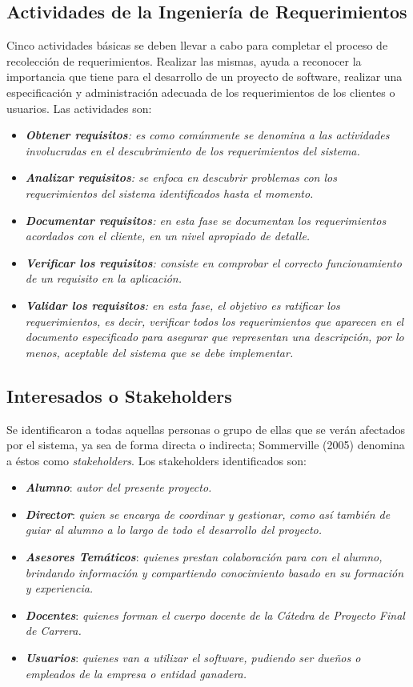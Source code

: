 \documentclass[11pt,oneside]{book}
\begin{document}
\subsection{Actividades de la Ingeniería de Requerimientos}
Cinco actividades básicas se deben llevar a cabo para completar el proceso de recolección de requerimientos. Realizar las mismas, ayuda a reconocer la importancia que tiene para el desarrollo de un proyecto de software, realizar una especificación y administración adecuada de los requerimientos de los clientes o usuarios. Las actividades son:
\begin{itemize}
\item \textit{\textbf{Obtener requisitos}: es como comúnmente se denomina a las actividades involucradas en el descubrimiento de los requerimientos del sistema.}
\item \textit{\textbf{Analizar requisitos}: se enfoca en descubrir problemas con los requerimientos del sistema identificados hasta el momento.}
\item \textit{\textbf{Documentar requisitos}: en esta fase se documentan los requerimientos acordados con el cliente, en un nivel apropiado de detalle.}
\item \textit{\textbf{Verificar los requisitos}: consiste en comprobar el correcto funcionamiento de un requisito en la aplicación.}
\item \textit{\textbf{Validar los requisitos}: en esta fase, el objetivo es ratificar los requerimientos, es decir, verificar todos los requerimientos que aparecen en el documento especificado para asegurar que representan una descripción, por lo menos, aceptable del sistema que se debe implementar.}
\end{itemize}

\subsection{Interesados o Stakeholders}
Se identificaron a todas aquellas personas o grupo de ellas que se verán afectados por el sistema, ya sea de forma directa o indirecta; Sommerville (2005) denomina a éstos como \textit{stakeholders}. Los stakeholders identificados son: 
\begin{itemize}
\item \textit{\textbf{Alumno}}: \textit{autor del presente proyecto.}
\item \textit{\textbf{Director}}: \textit{quien se encarga de coordinar y gestionar, como así también de guiar al alumno a lo largo de todo el desarrollo del proyecto.}
\item \textit{\textbf{Asesores Temáticos}}: \textit{quienes prestan colaboración para con el alumno, brindando información y compartiendo conocimiento basado en su formación y experiencia.}
\item \textit{\textbf{Docentes}}: \textit{quienes forman el cuerpo docente de la Cátedra de Proyecto Final de Carrera.}
\item \textit{\textbf{Usuarios}}: \textit{quienes van a utilizar el software, pudiendo ser dueños o empleados de la empresa o entidad ganadera.}
\end{itemize}
\end{document}
